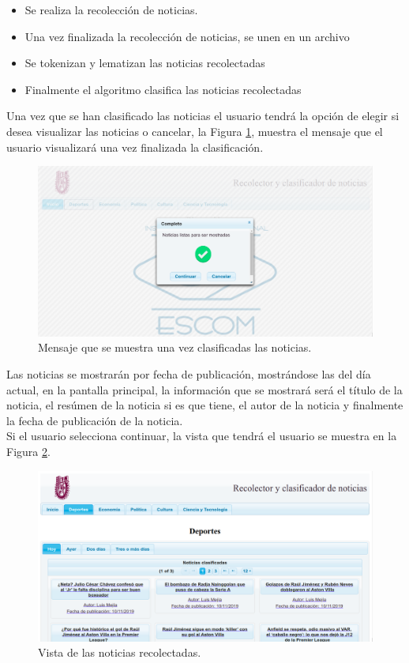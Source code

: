 \begin{itemize}
	\item Se realiza la recolección de noticias.  
	\item Una vez finalizada la recolección de noticias, se unen en un archivo
	\item Se tokenizan y lematizan las noticias recolectadas
	\item Finalmente el algoritmo clasifica las noticias recolectadas
\end{itemize}

Una vez que se han clasificado las noticias el usuario tendrá la opción de elegir si desea visualizar las noticias o cancelar, la Figura \ref{fig:notClass}, muestra el mensaje que el usuario visualizará una vez finalizada la clasificación.
\\
\begin{figure}[H]
\centering
\includegraphics[scale=0.29]{imagenes/Capitulo5/noticiasListasParaSerMostradas.png}
\caption{Mensaje que se muestra una vez clasificadas las noticias.}
\label{fig:notClass}
\end{figure}

Las noticias se mostrarán por fecha de publicación, mostrándose las del día actual, en la pantalla principal, la información que se mostrará será el título de la noticia, el resúmen de la noticia si es que tiene, el autor de la noticia y finalmente la fecha de publicación de la noticia.\\
Si el usuario selecciona continuar, la vista que tendrá el usuario se muestra en la Figura \ref{fig:vistaNoticias}.
\\
\begin{figure}[H]
\centering
\includegraphics[scale=0.29]{imagenes/Capitulo5/noticiasDeHoy.png}
\caption{Vista de las noticias recolectadas.}
\label{fig:vistaNoticias}
\end{figure}

